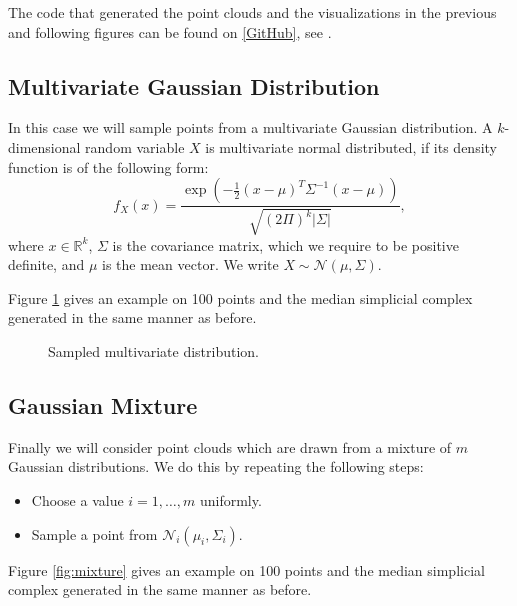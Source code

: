 The code that generated the point clouds and the visualizations in the previous and following figures can be found on \href{https://github.com/IvanSpirandelli/Masterarbeit}{[GitHub]}, see \cite{github}.

\subsection{Multivariate Gaussian Distribution}
In this case we will sample points from a multivariate Gaussian distribution. 
A $k$-dimensional random variable $X$ is multivariate normal distributed, if its density function is of the following form: \[
f_X(x) = \frac{\operatorname{exp}(-\frac{1}{2}(x-\mu)^T \Sigma^{-1}(x - \mu))}{\sqrt{(2 \Pi)^k |\Sigma|}},
\]
where $x\in \mathbb{R}^k$, $\Sigma$ is the covariance matrix, which we require to be positive definite, and $\mu$ is the mean vector. We write $X \sim \mathcal{N}(\mu,\Sigma)$.

Figure \ref{fig:multivariate} gives an example on 100 points and the median simplicial complex generated in the same manner as before.

\begin{figure}[H]
\begin{subfigure}[t]{0.49\textwidth}
\begin{center}

\end{center}
\end{subfigure}
\begin{subfigure}[t]{0.49\textwidth}
\begin{center}

\end{center}
\end{subfigure}
\caption{Sampled multivariate distribution.}
\label{fig:multivariate}
\end{figure}

\subsection{Gaussian Mixture}
Finally we will consider point clouds which are drawn from a mixture of $m$ Gaussian distributions. We do this by repeating the following steps: \begin{itemize}
    \item Choose a value $i= 1,\dots,m$ uniformly.
    \item Sample a point from $\mathcal{N}_i(\mu_i,\Sigma_i)$.
\end{itemize}
Figure \ref{fig:mixture} gives an example on 100 points and the median simplicial complex generated in the same manner as before.

